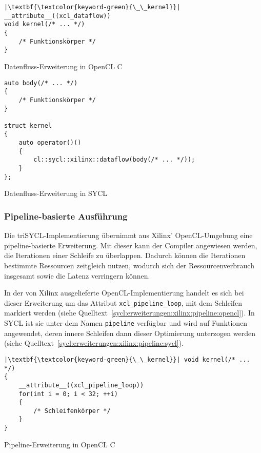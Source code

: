 \begin{code}
    \begin{verbatim}
|\textbf{\textcolor{keyword-green}{\_\_kernel}}| __attribute__((xcl_dataflow))
void kernel(/* ... */)
{
    /* Funktionskörper */
}
    \end{verbatim}
    \caption{Datenfluss-Erweiterung in OpenCL C}
    \label{sycl:erweiterungen:xilinx:dataflow:opencl}
\end{code}

\begin{code}
    \begin{verbatim}
auto body(/* ... */)
{
    /* Funktionskörper */
}

struct kernel
{
    auto operator()()
    {
        cl::sycl::xilinx::dataflow(body(/* ... */));
    }
};
    \end{verbatim}
    \caption{Datenfluss-Erweiterung in SYCL}
    \label{sycl:erweiterungen:xilinx:dataflow:sycl}
\end{code}

\subsubsection{Pipeline-basierte Ausführung}
\label{sycl:erweiterungen:xilinx:pipeline}

Die triSYCL-Implementierung übernimmt aus Xilinx' OpenCL-Umgebung eine
pipeline-basierte Erweiterung. Mit dieser kann der Compiler angewiesen werden,
die Iterationen einer Schleife zu überlappen. Dadurch können die Iterationen
bestimmte Ressourcen zeitgleich nutzen, wodurch sich der Ressourcenverbrauch
insgesamt sowie die Latenz verringern können.
\cite[siehe][67\psqq]{sdaccelopt2019}

In der von Xilinx ausgelieferte OpenCL-Implementierung handelt es sich bei
dieser Erweiterung um das Attribut \texttt{xcl\_pipeline\_loop}, mit dem
Schleifen markiert werden (siehe
Quelltext~\ref{sycl:erweiterungen:xilinx:pipeline:opencl}). In SYCL ist sie
unter dem Namen \texttt{pipeline} verfügbar und wird auf Funktionen angewendet,
deren innere Schleifen dann dieser Optimierung unterzogen werden (siehe
Quelltext~\ref{sycl:erweiterungen:xilinx:pipeline:sycl}).

\begin{code}
    \begin{verbatim}
|\textbf{\textcolor{keyword-green}{\_\_kernel}}| void kernel(/* ... */)
{
    __attribute__((xcl_pipeline_loop))
    for(int i = 0; i < 32; ++i)
    {
        /* Schleifenkörper */
    }
}
    \end{verbatim}
    \caption{Pipeline-Erweiterung in OpenCL C}
    \label{sycl:erweiterungen:xilinx:pipeline:opencl}
\end{code}

